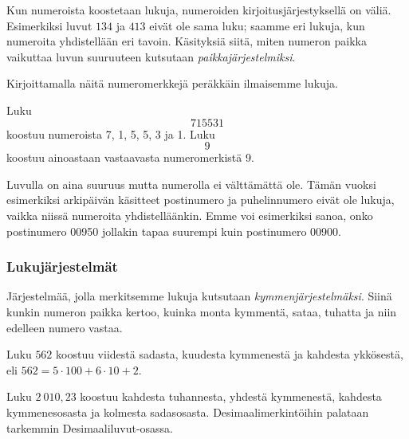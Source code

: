 Kun numeroista koostetaan lukuja, numeroiden kirjoitusjärjestyksellä on väliä. Esimerkiksi luvut $134$ ja $413$ eivät ole sama luku; saamme eri lukuja, kun numeroita yhdistellään eri tavoin. Käsityksiä siitä, miten numeron paikka vaikuttaa luvun suuruuteen kutsutaan \emph{paikkajärjestelmiksi}.


Kirjoittamalla näitä numeromerkkejä peräkkäin ilmaisemme lukuja.


\begin{esimerkki}
Luku \[715531\] koostuu numeroista 7, 1, 5, 5, 3 ja 1.
Luku \[9\] koostuu ainoastaan vastaavasta numeromerkistä 9.
\end{esimerkki}

Luvulla on aina suuruus mutta numerolla ei välttämättä ole. Tämän vuoksi esimerkiksi arkipäivän käsitteet postinumero ja puhelinnumero eivät ole lukuja, vaikka niissä numeroita yhdistelläänkin. Emme voi esimerkiksi sanoa, onko postinumero 00950 jollakin tapaa suurempi kuin postinumero 00900.

\subsubsection*{Lukujärjestelmät}

Järjestelmää, jolla merkitsemme lukuja kutsutaan \emph{kymmenjärjestelmäksi}. Siinä kunkin numeron paikka kertoo, kuinka monta kymmentä, sataa, tuhatta ja niin edelleen numero vastaa.

\begin{esimerkki}
Luku $562$ koostuu viidestä sadasta, kuudesta kymmenestä ja kahdesta ykkösestä, eli $562= 5 \cdot 100 + 6 \cdot 10 + 2$.

Luku $2~010,23$ koostuu kahdesta tuhannesta, yhdestä kymmenestä, kahdesta kymmenesosasta ja kolmesta sadasosasta. Desimaalimerkintöihin palataan tarkemmin Desimaaliluvut-osassa.
\end{esimerkki}


